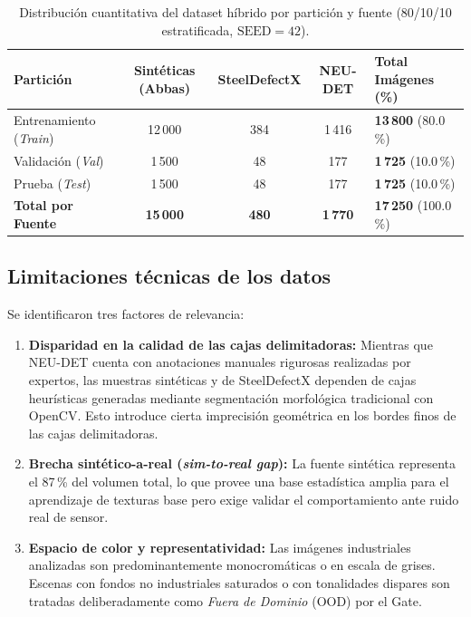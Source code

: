 \documentclass[11pt,a4paper]{article}
\begin{document}
\begin{table}[H]
  \centering\small
  \caption{Distribución cuantitativa del dataset híbrido por partición y fuente (80/10/10 estratificada, $\text{SEED}=42$).}
  \label{tab:split}
  \begin{tabularx}{\textwidth}{@{}l c c c X@{}}
    \toprule
    \textbf{Partición} & \textbf{Sintéticas (Abbas)} & \textbf{SteelDefectX} & \textbf{NEU-DET} & \textbf{Total Imágenes (\%)} \\
    \midrule
    Entrenamiento (\emph{Train}) & 12\,000 & 384 & 1\,416 & \textbf{13\,800} (80.0\,\%) \\
    Validación (\emph{Val})      & 1\,500  & 48  & 177   & \textbf{1\,725} (10.0\,\%) \\
    Prueba (\emph{Test})         & 1\,500  & 48  & 177   & \textbf{1\,725} (10.0\,\%) \\
    \midrule
    \textbf{Total por Fuente}    & \textbf{15\,000} & \textbf{480} & \textbf{1\,770} & \textbf{17\,250} (100.0\,\%) \\
    \bottomrule
  \end{tabularx}
\end{table}

\subsection{Limitaciones técnicas de los datos}
Se identificaron tres factores de relevancia:
\begin{enumerate}[leftmargin=1.6em,itemsep=0.1em]
  \item \textbf{Disparidad en la calidad de las cajas delimitadoras:} Mientras que
  NEU-DET cuenta con anotaciones manuales rigurosas realizadas por expertos, las
  muestras sintéticas y de SteelDefectX dependen de cajas heurísticas generadas
  mediante segmentación morfológica tradicional con OpenCV. Esto introduce cierta
  imprecisión geométrica en los bordes finos de las cajas delimitadoras.
  \item \textbf{Brecha sintético-a-real (\emph{sim-to-real gap}):} La fuente
  sintética representa el 87\,\% del volumen total, lo que provee una base
  estadística amplia para el aprendizaje de texturas base pero exige validar el
  comportamiento ante ruido real de sensor.
  \item \textbf{Espacio de color y representatividad:} Las imágenes industriales
  analizadas son predominantemente monocromáticas o en escala de grises. Escenas
  con fondos no industriales saturados o con tonalidades dispares son tratadas
  deliberadamente como \emph{Fuera de Dominio} (OOD) por el Gate.
\end{enumerate}
\end{document}
